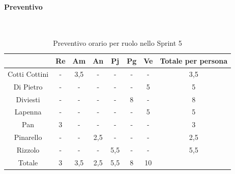\documentclass{article}
\begin{document}
                \paragraph{Preventivo}\mbox{}\\
                \begin{table}[H]
                    \centering
                    \begin{tabular}{|c|c|c|c|c|c|c|c|}
                    \hline
                                  & Re  & Am  & An  & Pj  & Pg  & Ve  & Totale per persona \\ \hline
                    Cotti Cottini & -   & 3,5 & -   & -   & -   & -   & 3,5                \\ \hline
                    Di Pietro     & -   & -   & -   & -   & -   & 5   & 5                  \\ \hline
                    Diviesti      & -   & -   & -   & -   & 8  & -   & 8                 \\ \hline
                    Lapenna       & -   & -   & -   & -   & -   & 5   & 5                  \\ \hline
                    Pan           & 3   & -   & -   & -   & -   & -   & 3                  \\ \hline
                    Pinarello     & -   & -   & 2,5 & -   & -   & -   & 2,5                \\ \hline
                    Rizzolo       & -   & -   & -   & 5,5 & -   & -   & 5,5                \\ \hline
                    Totale        & 3   & 3,5 & 2,5 & 5,5 & 8  & 10  &                    \\ \hline
                    \end{tabular}
                    \caption{Preventivo orario per ruolo nello Sprint 5}
                \end{table}

\end{document}
